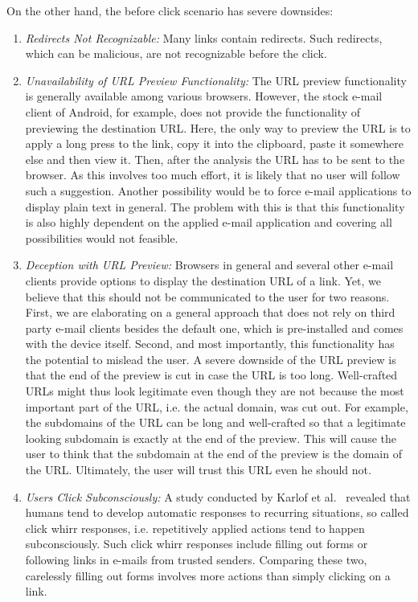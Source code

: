 \begin{description}[leftmargin=0cm]
On the other hand, the before click scenario has severe downsides:

\begin{enumerate}
	\item \textit{Redirects Not Recognizable:} Many links contain redirects. Such redirects, which can be malicious, are not recognizable before the click.
	\item \textit{Unavailability of URL Preview Functionality:} The URL preview functionality is generally available among various browsers. 
However, the stock e-mail client of Android, for example, does not provide the functionality of previewing the destination URL. 
Here, the only way to preview the URL is to apply a long press to the link, copy it into the clipboard, paste it somewhere else and then view it. 
Then, after the analysis the URL has to be sent to the browser.
As this involves too much effort, it is likely that no user will follow such a suggestion.
Another possibility would be to force e-mail applications to display plain text in general.
The problem with this is that this functionality is also highly dependent on the applied e-mail application and covering all possibilities would not feasible.
	\item \textit{Deception with URL Preview:} Browsers in general and several other e-mail clients provide options to display the destination URL of a link.
Yet, we believe that this should not be communicated to the user for two reasons.
First, we are elaborating on a general approach that does not rely on third party e-mail clients besides the default one, which is pre-installed and comes with the device itself.
Second, and most importantly, this functionality has the potential to mislead the user.
A severe downside of the URL preview is that the end of the preview is cut in case the URL is too long.
 Well-crafted URLs might thus look legitimate even though they are not because the most important part of the URL, i.e. the actual domain, was cut out.
 For example, the subdomains of the URL can be long and well-crafted so that a legitimate looking subdomain is exactly at the end of the preview.
 This will cause the user to think that the subdomain at the end of the preview is the domain of the URL.
 Ultimately, the user will trust this URL even he should not.
\item \textit{Users Click Subconsciously:} A study conducted by Karlof et al.~\cite{karlof2009conditioned} revealed that humans tend to develop automatic responses to recurring situations, so called click whirr responses, i.e. repetitively applied actions tend to happen subconsciously. Such click whirr responses include filling out forms or following links in e-mails from trusted senders. Comparing these two, carelessly filling out forms involves more actions than simply clicking on a link.

\end{enumerate}
\end{description}
